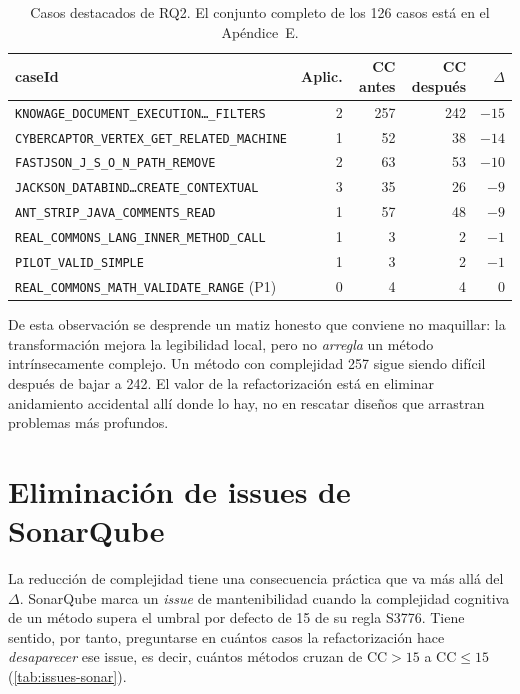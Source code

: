 \begin{table}[ht]
\centering
\caption{Casos destacados de RQ2. El conjunto completo de los 126
casos está en el Apéndice~E.}
\label{tab:rq2-destacados}
\begin{tabular}{@{}lrrrr@{}}
\toprule
\textbf{caseId} & \textbf{Aplic.} & \textbf{CC antes} & \textbf{CC después} & \textbf{$\Delta$} \\
\midrule
\texttt{KNOWAGE\_DOCUMENT\_EXECUTION\dots\_FILTERS} & 2 & 257 & 242 & $-15$ \\
\texttt{CYBERCAPTOR\_VERTEX\_GET\_RELATED\_MACHINE} & 1 & 52 & 38 & $-14$ \\
\texttt{FASTJSON\_J\_S\_O\_N\_PATH\_REMOVE}          & 2 & 63 & 53 & $-10$ \\
\texttt{JACKSON\_DATABIND\dots CREATE\_CONTEXTUAL}   & 3 & 35 & 26 & $-9$ \\
\texttt{ANT\_STRIP\_JAVA\_COMMENTS\_READ}           & 1 & 57 & 48 & $-9$ \\
\texttt{REAL\_COMMONS\_LANG\_INNER\_METHOD\_CALL}    & 1 & 3  & 2  & $-1$ \\
\texttt{PILOT\_VALID\_SIMPLE}                       & 1 & 3  & 2  & $-1$ \\
\texttt{REAL\_COMMONS\_MATH\_VALIDATE\_RANGE} (P1)  & 0 & 4  & 4  & $0$ \\
\bottomrule
\end{tabular}
\end{table}

De esta observación se desprende un matiz honesto que conviene no maquillar: la
transformación mejora la legibilidad local, pero no \emph{arregla} un método
intrínsecamente complejo. Un método con complejidad 257 sigue siendo difícil
después de bajar a 242. El valor de la refactorización está en eliminar
anidamiento accidental allí donde lo hay, no en rescatar diseños que arrastran
problemas más profundos.

\section{Eliminación de issues de SonarQube}
\label{sec:resultados-issues}
La reducción de complejidad tiene una consecuencia práctica que va más allá del
$\Delta$. SonarQube marca un \emph{issue} de mantenibilidad cuando la
complejidad cognitiva de un método supera el umbral por defecto de 15 de su
regla S3776. Tiene sentido, por tanto, preguntarse en cuántos casos la
refactorización hace \emph{desaparecer} ese issue, es decir, cuántos métodos
cruzan de $\text{CC}>15$ a $\text{CC}\le 15$ (\autoref{tab:issues-sonar}).

